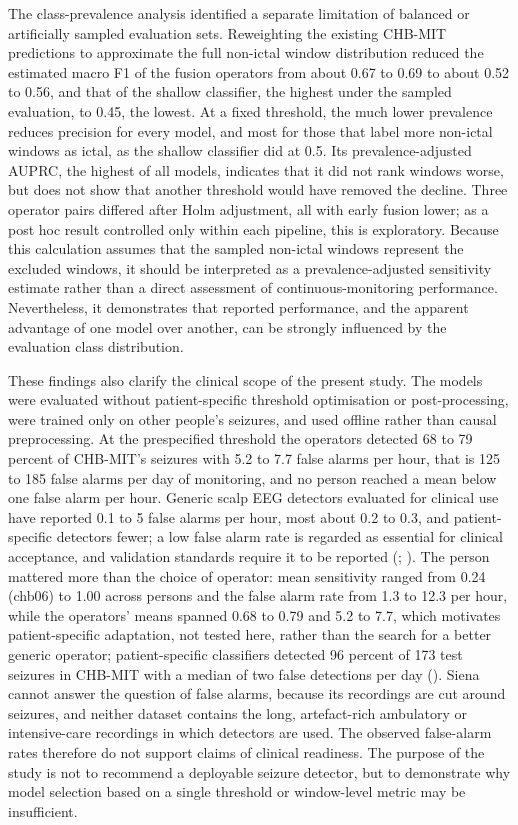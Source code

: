 \documentclass[11pt,a4paper]{article}
\begin{document}
The class-prevalence analysis identified a separate limitation of balanced or
artificially sampled evaluation sets. Reweighting the existing CHB-MIT predictions to
approximate the full non-ictal window distribution reduced the estimated macro F1 of the
fusion operators from about 0.67 to 0.69 to about 0.52 to 0.56, and that of the shallow
classifier, the highest under the sampled evaluation, to 0.45, the lowest. At a fixed
threshold, the much lower prevalence reduces precision for every model, and most for
those that label more non-ictal windows as ictal, as the shallow classifier did at 0.5.
Its prevalence-adjusted AUPRC, the highest of all models, indicates that it did not rank
windows worse, but does not show that another threshold would have removed the decline.
Three operator pairs differed after Holm adjustment, all with early fusion lower; as a
post hoc result controlled only within each pipeline, this is exploratory. Because this
calculation assumes that the sampled non-ictal windows represent the excluded windows, it
should be interpreted as a prevalence-adjusted sensitivity estimate rather than a direct
assessment of continuous-monitoring performance. Nevertheless, it demonstrates that
reported performance, and the apparent advantage of one model over another, can be
strongly influenced by the evaluation class distribution.

These findings also clarify the clinical scope of the present study. The models were
evaluated without patient-specific threshold optimisation or post-processing, were
trained only on other people's seizures, and used offline rather than causal
preprocessing. At the prespecified threshold the operators detected 68 to 79 percent of
CHB-MIT's seizures with 5.2 to 7.7 false alarms per hour, that is 125 to 185 false alarms
per day of monitoring, and no person reached a mean below one false alarm per hour.
Generic scalp EEG detectors evaluated for clinical use have reported 0.1 to 5 false alarms
per hour, most about 0.2 to 0.3, and patient-specific detectors fewer; a low false alarm
rate is regarded as essential for clinical acceptance, and validation standards require
it to be reported (\citealp{Baumgartner_2018}; \citealp{Beniczky_2018}). The person
mattered more than the choice of operator: mean sensitivity ranged from 0.24 (chb06) to
1.00 across persons and the false alarm rate from 1.3 to 12.3 per hour, while the
operators' means spanned 0.68 to 0.79 and 5.2 to 7.7, which motivates patient-specific adaptation, not tested here, rather than the search for a better generic operator; patient-specific classifiers
detected 96 percent of 173 test seizures in CHB-MIT with a median of two false detections per
day (\citealp{Shoeb_2010}). Siena cannot answer the question of false alarms, because
its recordings are cut around seizures, and neither dataset contains the long,
artefact-rich ambulatory or intensive-care recordings in which detectors are used. The
observed false-alarm rates therefore do not support claims of clinical readiness. The
purpose of the study is not to recommend a deployable seizure detector, but to
demonstrate why model selection based on a single threshold or window-level metric may
be insufficient.
\end{document}
